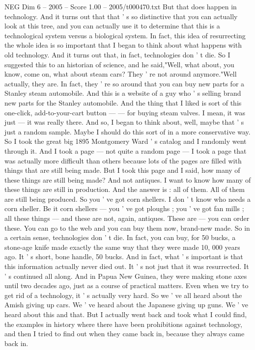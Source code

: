 \begin{textsample}{NEG Dim 6 – 2005 – Score 1.00 – 2005/t000470.txt}
But that does happen in technology.
And it turns out that that ' s so distinctive that you can actually look at this tree, and you can actually use it to determine that this is a technological system versus a biological system.
In fact, this idea of resurrecting the whole idea is so important that I began to think about what happens with old technology.
And it turns out that, in fact, technologies don ' t die.
So I suggested this to an historian of science, and he said,"Well, what about, you know, come on, what about steam cars?
They ' re not around anymore."Well actually, they are.
In fact, they ' re so around that you can buy new parts for a Stanley steam automobile.
And this is a website of a guy who ' s selling brand new parts for the Stanley automobile.
And the thing that I liked is sort of this one-click, add-to-your-cart button — — for buying steam valves.
I mean, it was just — it was really there.
And so, I began to think about, well, maybe that ' s just a random sample.
Maybe I should do this sort of in a more conservative way.
So I took the great big 1895 Montgomery Ward ' s catalog and I randomly went through it.
And I took a page — not quite a random page — I took a page that was actually more difficult than others because lots of the pages are filled with things that are still being made.
But I took this page and I said, how many of these things are still being made?
And not antiques.
I want to know how many of these things are still in production.
And the answer is : all of them.
All of them are still being produced.
So you ' ve got corn shellers.
I don ' t know who needs a corn sheller.
Be it corn shellers — you ' ve got ploughs ; you ' ve got fan mills ; all these things — and these are not, again, antiques.
These are — you can order these.
You can go to the web and you can buy them now, brand-new made.
So in a certain sense, technologies don ' t die.
In fact, you can buy, for 50 bucks, a stone-age knife made exactly the same way that they were made 10, 000 years ago.
It ' s short, bone handle, 50 bucks.
And in fact, what ' s important is that this information actually never died out.
It ' s not just that it was resurrected.
It ' s continued all along.
And in Papua New Guinea, they were making stone axes until two decades ago, just as a course of practical matters.
Even when we try to get rid of a technology, it ' s actually very hard.
So we ' ve all heard about the Amish giving up cars.
We ' ve heard about the Japanese giving up guns.
We ' ve heard about this and that.
But I actually went back and took what I could find, the examples in history where there have been prohibitions against technology, and then I tried to find out when they came back in, because they always came back in.

\end{textsample}
